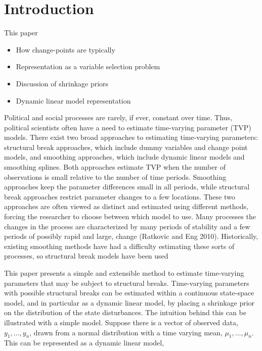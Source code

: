 
\section{Introduction}
\label{dlm:sec:introduction}

This paper 


\begin{itemize}
\item How change-points are typically 
\item Representation as a variable selection problem
\item Discussion of shrinkage priors
\item Dynamic linear model representation
\end{itemize}

Political and social processes are rarely, if ever, constant over time.
Thus, political scientists often have a need to estimate time-varying parameter (TVP) models.
There exist two broad approaches to estimating time-varying parameters: structural break approaches, which include dummy variables and change point models, and smoothing approaches, which include dynamic linear models and smoothing splines. 
Both approaches estimate TVP when the number of observations is small relative to the number of time periods. 
Smoothing approaches keep the parameter differences small in all periods, while structural break approaches restrict parameter changes to a few locations. 
These two approaches are often viewed as distinct and estimated using different methods, forcing the researcher to choose between which model to use.
Many processes the changes in the process are characterized by many periods of stability and a few periods of possibly rapid and large, change (Ratkovic and Eng 2010).
Historically, existing smoothing methods have had a difficulty estimating these sorts of processes, so structural break models have been used

This paper presents a simple and extensible method to estimate time-varying parameters that may be subject to structural breaks. 
Time-varying parameters with possible structural breaks can be estimated within a continuous state-space model, and in particular as a dynamic linear model, by placing a shrinkage prior on the distribution of the state disturbances.
The intuition behind this can be illustrated with a simple model.
Suppose there is a vector of observed data, $y_{1}, \dots, y_{n}$, drawn from a normal distribution with a time varying mean, $\mu_{1}, \dots, \mu_{n}$.
This can be represented as a dynamic linear model,

